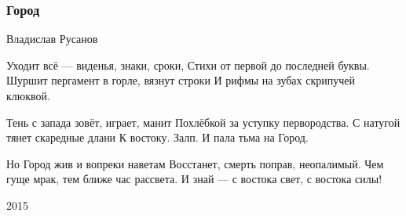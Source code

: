  
 
 

\subsubsection{Город}
\label{sec:poetry.rus.dnr.vladislav_rusanov.gorod}

Владислав Русанов

Уходит всё --- виденья, знаки, сроки,
Стихи от первой до последней буквы.
Шуршит пергамент в горле, вязнут строки
И рифмы на зубах скрипучей клюквой.

Тень с запада зовёт, играет, манит
Похлёбкой за уступку первородства.
С натугой тянет скаредные длани
К востоку. Залп. И пала тьма на Город.

Но Город жив и вопреки наветам
Восстанет, смерть поправ, неопалимый.
Чем гуще мрак, тем ближе час рассвета.
И знай --- с востока свет, с востока силы!

2015 
